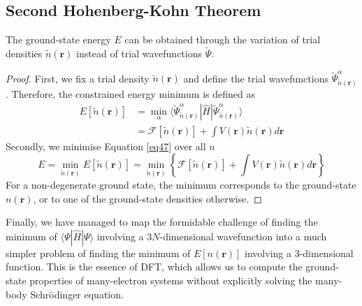\subsection{Second Hohenberg-Kohn Theorem}
\begin{theorem}
  The ground-state energy $E$ can be obtained through the variation of trial densities $\tilde{n}(\mathbf{r})$ instead of trial wavefunctions $\tilde{\Psi}$.
\end{theorem}
\begin{proof}
  First, we fix a trial density $\tilde{n}(\mathbf{r})$ and define the trial wavefunctions $\tilde{\Psi}^{\alpha}_{\tilde{n}(\mathbf{r})}$. Therefore, the constrained energy minimum is defined as 
\begin{equation}
  \label{eq47}
  \begin{aligned}
    E[\tilde{n}(\mathbf{r})] &= \min_{\alpha} \langle \tilde{\Psi}^{\alpha}_{\tilde{n}(\mathbf{r})} | \hat{H} | \tilde{\Psi}^{\alpha}_{\tilde{n}(\mathbf{r})} \rangle\\
    &= \mathcal{F}[\tilde{n}(\mathbf{r})] + \int V(\mathbf{r}) \tilde{n}(\mathbf{r}) d\mathbf{r}
  \end{aligned}
\end{equation}
  Secondly, we minimise Equation \ref{eq47} over all $n$
  \begin{equation}
    \label{eq48}
    E = \min_{\tilde{n}(\mathbf{r})} E[\tilde{n}(\mathbf{r})] = \min_{\tilde{n}(\mathbf{r})} \left\{\mathcal{F}[\tilde{n}(\mathbf{r})] + \int V(\mathbf{r}) \tilde{n}(\mathbf{r}) d\mathbf{r}\right\}
  \end{equation}
For a non-degenerate ground state, the minimum corresponds to the ground-state $n(\mathbf{r})$, or to one of the ground-state densities otherwise.
\end{proof}
Finally, we have managed to map the formidable challenge of finding the minimum of $\langle \Psi | \hat{H} | \Psi \rangle$ involving a $3N$-dimensional wavefunction into a much simpler problem of finding the minimum of $E[n(\mathbf{r})]$ involving a $3$-dimensional function. This is the essence of DFT, which allows us to compute the ground-state properties of many-electron systems without explicitly solving the many-body Schrödinger equation.


